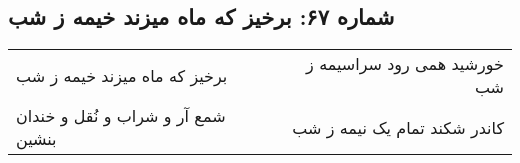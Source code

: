 \begin{center}
\section*{شماره ۶۷: برخیز که ماه میزند خیمه ز شب}
\label{sec:067}
\begin{longtable}{l p{0.5cm} r}
برخیز که ماه میزند خیمه ز شب
&&
خورشید همی رود سراسیمه ز شب
\\
شمع آر و شراب و نُقل و خندان بنشین
&&
کاندر شکند تمام یک نیمه ز شب
\\
\end{longtable}
\end{center}
